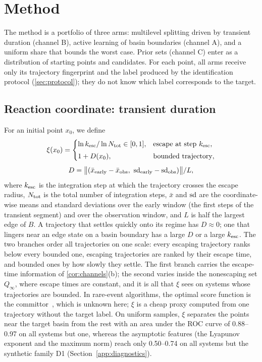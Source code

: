 \section{Method}\label{sec:method}

The method is a portfolio of three arms: multilevel splitting driven by transient duration (channel B), active learning of basin boundaries (channel A), and a uniform share that bounds the worst case. Prior sets (channel C) enter as a distribution of starting points and candidates. For each point, all arms receive only its trajectory fingerprint and the label produced by the identification protocol (\cref{sec:protocol}); they do not know which label corresponds to the target.

\subsection{Reaction coordinate: transient duration}\label{sec:xi}

For an initial point $x_0$, we define
\begin{equation}
\xi(x_0)=\begin{cases}\ln k_{\rm esc}/\ln N_{\rm tot}\in[0,1], & \text{escape at step } k_{\rm esc},\\[1mm] 1+D(x_0), & \text{bounded trajectory},\end{cases}
\label{eq:xi}
\end{equation}
\begin{equation*}
D=\bigl\|(\bar x_{\rm early}-\bar x_{\rm obs},\ {\rm sd}_{\rm early}-{\rm sd}_{\rm obs})\bigr\|/L,
\end{equation*}
where $k_{\rm esc}$ is the integration step at which the trajectory crosses the escape radius, $N_{\rm tot}$ is the total number of integration steps, $\bar x$ and ${\rm sd}$ are the coordinate-wise means and standard deviations over the early window (the first steps of the transient segment) and over the observation window, and $L$ is half the largest edge of $B$. A trajectory that settles quickly onto its regime has $D\approx0$; one that lingers near an edge state on a basin boundary has a large $D$ or a large $k_{\rm esc}$. The two branches order all trajectories on one scale: every escaping trajectory ranks below every bounded one, escaping trajectories are ranked by their escape time, and bounded ones by how slowly they settle. The first branch carries the escape-time information of \cref{cor:channels}(b); the second varies inside the nonescaping set $Q_\infty$, where escape times are constant, and it is all that $\xi$ sees on systems whose trajectories are bounded. In rare-event algorithms, the optimal score function is the committor~\cite{Lestang2018TAMS,Lucente2022Committor}, which is unknown here; $\xi$ is a cheap proxy computed from one trajectory without the target label. On uniform samples, $\xi$ separates the points near the target basin from the rest with an area under the ROC curve of 0.88--0.97 on all systems but one, whereas the asymptotic features (the Lyapunov exponent and the maximum norm) reach only 0.50--0.74 on all systems but the synthetic family D1 (Section~\ref{app:diagnostics}).

